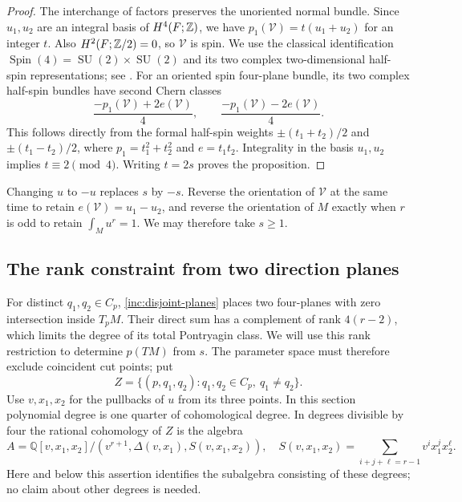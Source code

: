 \begin{proof}
The interchange of factors preserves the unoriented normal
bundle. Since $u_1,u_2$ are an integral basis of $H^4(F;\mathbb Z)$,
we have $p_1(\mathcal V)=t(u_1+u_2)$ for an integer $t$.
Also $H^2(F;\mathbb Z/2)=0$, so $\mathcal V$ is spin.
We use the classical identification
$\operatorname{Spin}(4)=\operatorname{SU}(2)\times\operatorname{SU}(2)$
and its two complex two-dimensional half-spin representations;
see \citet[Sections~2.1--2.2]{Moore2010}. For an oriented spin
four-plane bundle, its two complex half-spin bundles have
second Chern classes
\[
 \frac{-p_1(\mathcal V)+2e(\mathcal V)}4,\qquad
 \frac{-p_1(\mathcal V)-2e(\mathcal V)}4.
\]
This follows directly from the formal half-spin weights
$\pm(t_1+t_2)/2$ and $\pm(t_1-t_2)/2$, where
$p_1=t_1^2+t_2^2$ and $e=t_1t_2$.
Integrality in the basis $u_1,u_2$ implies $t\equiv2\pmod4$.
Writing $t=2s$ proves the proposition.
\end{proof}

Changing $u$ to $-u$ replaces $s$ by $-s$. Reverse the orientation
of $\mathcal V$ at the same time to retain
$e(\mathcal V)=u_1-u_2$, and reverse the orientation of $M$
exactly when $r$ is odd to retain $\int_Mu^r=1$.
We may therefore take $s\ge1$.

\subsection{The rank constraint from two direction planes}

For distinct $q_1,q_2\in C_p$, \eqref{inc:disjoint-planes} places
two four-planes with zero intersection inside $T_pM$. Their direct
sum has a complement of rank $4(r-2)$, which limits the degree
of its total Pontryagin class. We will use this rank restriction
to determine $p(TM)$ from $s$. The parameter space must therefore
exclude coincident cut points; put
\[
 Z=\{(p,q_1,q_2):q_1,q_2\in C_p,\ q_1\ne q_2\}.
\]
Use $v,x_1,x_2$ for the pullbacks of $u$ from its three points.
In this section polynomial degree is one quarter of cohomological
degree. In degrees divisible by four the rational cohomology of
$Z$ is the algebra
\begin{equation}\label{inc:triple-ring}
 A=\mathbb Q[v,x_1,x_2]/(v^{r+1},\Delta(v,x_1),S(v,x_1,x_2)),
 \quad
 S(v,x_1,x_2)=\sum_{i+j+\ell=r-1}v^ix_1^jx_2^\ell.
\end{equation}
Here and below this assertion identifies the subalgebra consisting
of these degrees; no claim about other degrees is needed.

